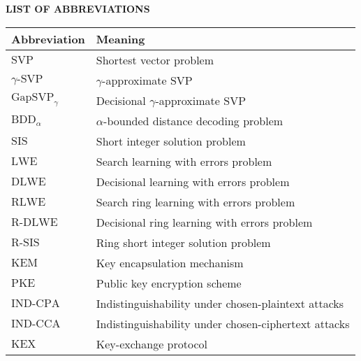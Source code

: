 
\begin{center}
    \textbf{\Large LIST OF ABBREVIATIONS}\\

    \vspace{1cm}   
    
	\begin{tabular}{ |l|l| } 
		\hline
		Abbreviation                 & Meaning                                              \\ \hline
		$\mathrm{SVP}$               & Shortest vector problem                              \\
		$\gamma\text{-}\mathrm{SVP}$ & $\gamma$-approximate $\mathrm{SVP}$                  \\
		$\mathrm{GapSVP}_{\gamma}$   & Decisional $\gamma$-approximate $\mathrm{SVP}$       \\
		$\mathrm{BDD}_{\alpha}$      & $\alpha$-bounded distance decoding problem           \\
		$\mathrm{SIS}$               & Short integer solution problem                       \\
		$\mathrm{LWE}$               & Search learning with errors problem                  \\
		$\mathrm{DLWE}$              & Decisional learning with errors problem              \\
		$\mathrm{RLWE}$              & Search ring learning with errors problem             \\
		$\mathrm{R\text{-}DLWE}$            & Decisional ring learning with errors problem         \\
		$\mathrm{R\text{-}SIS}$      & Ring short integer solution problem                  \\
		$\mathrm{KEM}$               & Key encapsulation mechanism                          \\
		$\mathrm{PKE}$               & Public key encryption scheme                         \\
		$\mathrm{IND\text{-}CPA}$    & Indistinguishability under chosen-plaintext attacks  \\
		$\mathrm{IND\text{-}CCA}$    & Indistinguishability under chosen-ciphertext attacks \\
		$\mathrm{KEX}$               & Key-exchange protocol                                \\
		\hline     
	\end{tabular}
\end{center}

\newpage